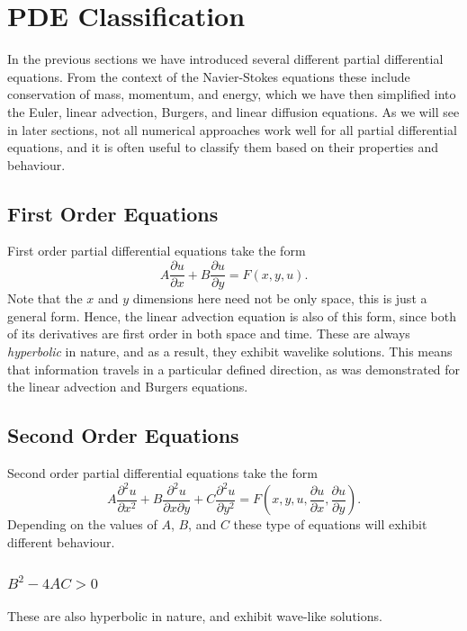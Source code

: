 \section{PDE Classification}
In the previous sections we have introduced several different partial differential equations. From the context of the Navier-Stokes equations these include conservation of mass, momentum, and energy, which we have then simplified into the Euler, linear advection, Burgers, and linear diffusion equations. As we will see in later sections, not all numerical approaches work well for all partial differential equations, and it is often useful to classify them based on their properties and behaviour.

\subsection{First Order Equations}
First order partial differential equations take the form
\begin{equation}
	A \frac{\partial u}{\partial x} + B \frac{\partial u}{\partial y} = F(x,y,u).
\end{equation}
Note that the $x$ and $y$ dimensions here need not be only space, this is just a general form. Hence, the linear advection equation is also of this form, since both of its derivatives are first order in both space and time. These are always {\it hyperbolic} in nature, and as a result, they exhibit wavelike solutions. This means that information travels in a particular defined direction, as was demonstrated for the linear advection and Burgers equations.

\subsection{Second Order Equations}
Second order partial differential equations take the form
\begin{equation}
	A \frac{\partial^2 u}{\partial x^2} + B \frac{\partial^2 u}{\partial x \partial y} + C \frac{\partial^2 u}{\partial y^2} = F(x,y,u,\frac{\partial u}{\partial x},\frac{\partial u}{\partial y}).
\end{equation}
Depending on the values of $A$, $B$, and $C$ these type of equations will exhibit different behaviour.

\subsubsection{$B^2-4AC > 0$}
These are also hyperbolic in nature, and exhibit wave-like solutions.


